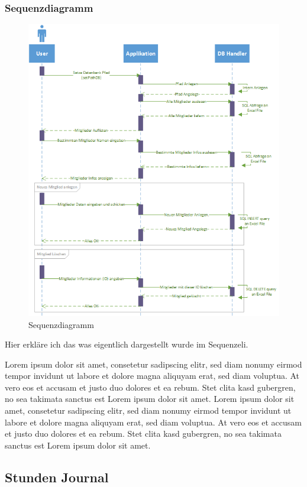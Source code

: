 \documentclass{article}
\begin{document}
\newpage

\subsubsection{Sequenzdiagramm}
\begin{figure}[h]
	\centering
	\includegraphics[width=0.8 \textwidth]{Sequenz-Diagramm_v1}
	\caption{Sequenzdiagramm}
\end{figure}

Hier erkläre ich das was eigentlich dargestellt wurde im Sequenzeli.

Lorem ipsum dolor sit amet, consetetur sadipscing elitr, sed diam nonumy eirmod tempor invidunt ut labore et dolore magna aliquyam erat, sed diam voluptua. At vero eos et accusam et justo duo dolores et ea rebum. Stet clita kasd gubergren, no sea takimata sanctus est Lorem ipsum dolor sit amet. Lorem ipsum dolor sit amet, consetetur sadipscing elitr, sed diam nonumy eirmod tempor invidunt ut labore et dolore magna aliquyam erat, sed diam voluptua. At vero eos et accusam et justo duo dolores et ea rebum. Stet clita kasd gubergren, no sea takimata sanctus est Lorem ipsum dolor sit amet.

\newpage

\subsection{Stunden Journal}
\end{document}
